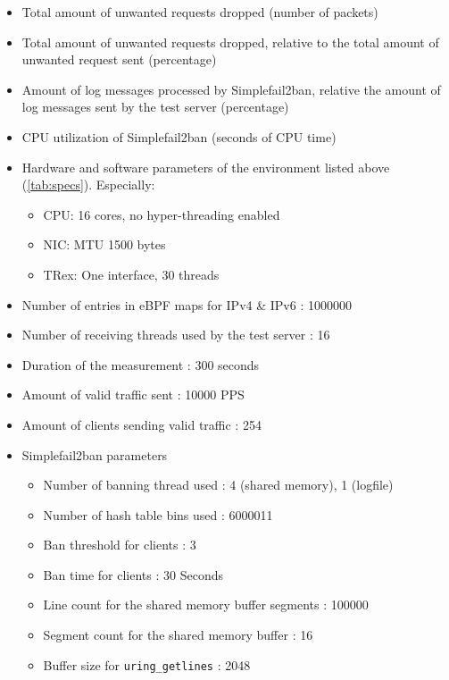 \begin{itemize}
	\item Total amount of unwanted requests dropped (number of packets)
	\item Total amount of unwanted requests dropped, relative to the total amount of unwanted
	request sent (percentage)
	\item Amount of log messages processed by Simplefail2ban, relative the amount of log messages
	sent by the test server (percentage)
	\item \ac{CPU} utilization of Simplefail2ban (seconds of \ac{CPU} time)
\end{itemize}

\begin{itemize}
	\item Hardware and software parameters of the environment listed above (\ref{tab:specs}). Especially:  
	\begin{itemize}
		\item \ac{CPU}: 16 cores, no hyper-threading enabled
		\item \ac{NIC}: MTU 1500 bytes
		\item TRex: One interface, 30 threads
	\end{itemize}
	\item Number of entries in \ac{eBPF} maps for \ac{IPv4} \& \ac{IPv6} : 1000000
	\item Number of receiving threads used by the test server : 16
	\item Duration of the measurement : 300 seconds
	\item Amount of valid traffic sent : 10000 \ac{PPS}
	\item Amount of clients sending valid traffic : 254
	\item Simplefail2ban parameters 
		\begin{itemize}
		\item Number of banning thread used : 4 (shared memory), 1 (logfile)
		\item Number of hash table bins used : 6000011
		\item Ban threshold for clients : 3
		\item Ban time for clients : 30 Seconds
		\item Line count for the shared memory buffer segments : 100000
		\item Segment count for the shared memory buffer : 16
		\item Buffer size for \texttt{uring\_getlines} : 2048
		\end{itemize}
\end{itemize}

